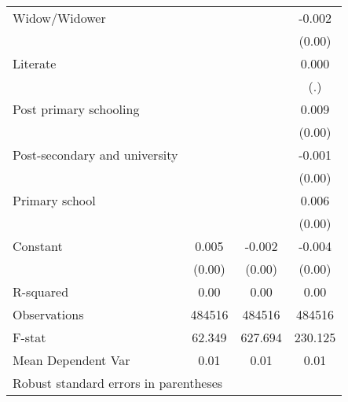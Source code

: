 {\begin{tabular}{l*{3}{c}}
Widow/Widower       &                     &                     &      -0.002         \\
                    &                     &                     &      (0.00)         \\
Literate            &                     &                     &       0.000         \\
                    &                     &                     &         (.)         \\
Post primary schooling&                     &                     &       0.009\sym{***}\\
                    &                     &                     &      (0.00)         \\
Post-secondary and university&                     &                     &      -0.001\sym{*}  \\
                    &                     &                     &      (0.00)         \\
Primary school      &                     &                     &       0.006\sym{***}\\
                    &                     &                     &      (0.00)         \\
Constant            &       0.005\sym{***}&      -0.002         &      -0.004         \\
                    &      (0.00)         &      (0.00)         &      (0.00)         \\
\hline
R-squared           &        0.00         &        0.00         &        0.00         \\
Observations        &      484516         &      484516         &      484516         \\
F-stat              &      62.349         &     627.694         &     230.125         \\
Mean Dependent Var  &        0.01         &        0.01         &        0.01         \\
\hline\hline
\multicolumn{4}{l}{\footnotesize Robust standard errors in parentheses}\\
\end{tabular}
}
